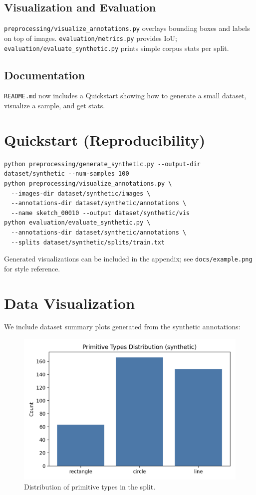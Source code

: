 \documentclass[11pt,a4paper]{article}
\begin{document}
\subsection{Visualization and Evaluation}
\texttt{preprocessing/visualize\_annotations.py} overlays bounding boxes and labels on top of images. \texttt{evaluation/metrics.py} provides IoU; \texttt{evaluation/evaluate\_synthetic.py} prints simple corpus stats per split.

\subsection{Documentation}
\texttt{README.md} now includes a Quickstart showing how to generate a small dataset, visualize a sample, and get stats.

\section{Quickstart (Reproducibility)}
\begin{verbatim}
python preprocessing/generate_synthetic.py --output-dir dataset/synthetic --num-samples 100
python preprocessing/visualize_annotations.py \
  --images-dir dataset/synthetic/images \
  --annotations-dir dataset/synthetic/annotations \
  --name sketch_00010 --output dataset/synthetic/vis
python evaluation/evaluate_synthetic.py \
  --annotations-dir dataset/synthetic/annotations \
  --splits dataset/synthetic/splits/train.txt
\end{verbatim}

Generated visualizations can be included in the appendix; see \texttt{docs/example.png} for style reference.

\section{Data Visualization}
We include dataset summary plots generated from the synthetic annotations:

\begin{figure}[!htbp]
  \centering
  \includegraphics[width=0.85\linewidth]{figs/primitive_types.png}
  \caption{Distribution of primitive types in the split.}\label{fig:types}
\end{figure}
\end{document}
